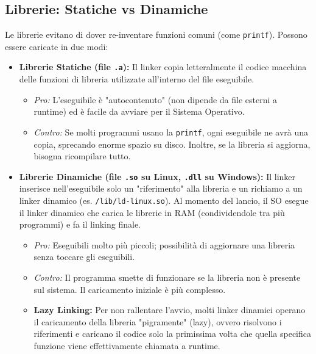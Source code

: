 \documentclass[12pt, a4paper]{article}
\begin{document}
\subsection{Librerie: Statiche vs Dinamiche}
Le librerie evitano di dover re-inventare funzioni comuni (come \texttt{printf}). Possono essere caricate in due modi:
\begin{itemize}
    \item \textbf{Librerie Statiche (file \texttt{.a}):} Il linker copia letteralmente il codice macchina delle funzioni di libreria utilizzate all'interno del file eseguibile.
    \begin{itemize}
        \item \textit{Pro:} L'eseguibile è "autocontenuto" (non dipende da file esterni a runtime) ed è facile da avviare per il Sistema Operativo.
        \item \textit{Contro:} Se molti programmi usano la \texttt{printf}, ogni eseguibile ne avrà una copia, sprecando enorme spazio su disco. Inoltre, se la libreria si aggiorna, bisogna ricompilare tutto.
    \end{itemize}
    \item \textbf{Librerie Dinamiche (file \texttt{.so} su Linux, \texttt{.dll} su Windows):} Il linker inserisce nell'eseguibile solo un "riferimento" alla libreria e un richiamo a un linker dinamico (es. \texttt{/lib/ld-linux.so}). Al momento del lancio, il SO esegue il linker dinamico che carica le librerie in RAM (condividendole tra più programmi) e fa il linking finale.
    \begin{itemize}
        \item \textit{Pro:} Eseguibili molto più piccoli; possibilità di aggiornare una libreria senza toccare gli eseguibili.
        \item \textit{Contro:} Il programma smette di funzionare se la libreria non è presente sul sistema. Il caricamento iniziale è più complesso.
        \item \textbf{Lazy Linking:} Per non rallentare l'avvio, molti linker dinamici operano il caricamento della libreria "pigramente" (lazy), ovvero risolvono i riferimenti e caricano il codice solo la primissima volta che quella specifica funzione viene effettivamente chiamata a runtime.
    \end{itemize}
\end{itemize}
\end{document}
